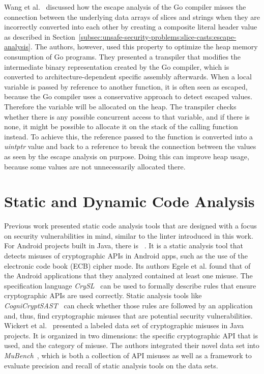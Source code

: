 Wang et al.~\cite{wang2020} discussed how the escape analysis of the Go compiler misses the connection between the
underlying data arrays of slices and strings when they are incorrectly converted into each other by creating a composite
literal header value as described in Section~\ref{subsec:unsafe-security-problems:slice-casts:escape-analysis}.
The authors, however, used this property to optimize the heap memory consumption of Go programs.
They presented a transpiler that modifies the intermediate binary representation created by the Go compiler, which is
converted to architecture-dependent specific assembly afterwards.
When a local variable is passed by reference to another function, it is often seen as escaped, because the Go compiler
uses a conservative approach to detect escaped values.
Therefore the variable will be allocated on the heap.
The transpiler checks whether there is any possible concurrent access to that variable, and if there is none, it might
be possible to allocate it on the stack of the calling function instead.
To achieve this, the reference passed to the function is converted into a \textit{uintptr} value and back to a reference
to break the connection between the values as seen by the escape analysis on purpose.
Doing this can improve heap usage, because some values are not unnecessarily allocated there.



\section{Static and Dynamic Code Analysis}\label{sec:related-work:static-code-analysis}

Previous work presented static code analysis tools that are designed with a focus on security vulnerabilities in mind,
similar to the \toolSafer{} linter introduced in this work.
For Android projects built in Java, there is \toolCryptolint{}~\cite{egele2013}.
It is a static analysis tool that detects misuses of cryptographic \acrshort{API}s in Android apps, such as the use of
the electronic code book (\acrshort{ECB}) cipher mode.
Its authors Egele et al. found that  of the  Android applications that they analyzed
contained at least one misuse.
The specification language \textit{CrySL}~\cite{kruger2018} can be used to formally describe rules that ensure
cryptographic \acrshort{API}s are used correctly.
Static analysis tools like \textit{CogniCryptSAST}~\cite{kruger2017} can check whether those rules are followed by an
application and, thus, find cryptographic misuses that are potential security vulnerabilities.
Wickert et al.~\cite{wickert2019} presented a labeled data set of  cryptographic misuses in Java projects.
It is organized in two dimensions: the specific cryptographic \acrshort{API} that is used, and the category of misuse.
The authors integrated their novel data set into \textit{MuBench}~\cite{amann2016}, which is both a collection of
\acrshort{API} misuses as well as a framework to evaluate precision and recall of static analysis tools on the data
sets.

